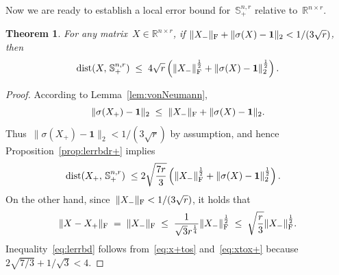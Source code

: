 \documentclass[11pt,a4paper]{article}  %
\newtheorem{theorem}{Theorem}%
\theoremstyle{definition}
\DeclareMathOperator{\dist}{dist}
\newcommand{\RR}{\mathbb{R}}
\newcommand{\col}{r}
\newcommand{\stf}[1]{\mathbb{S}^{#1}}
\newcommand{\fro}{{\scriptstyle{\textnormal{F}}}}
\newcommand{\ones}{\mathbf{1}}
\begin{document}
Now we are ready to establish a local error bound for~$\stf{n,\col}_+$ relative to~$\RR^{n\times \col}$.
\begin{theorem}%
    \label{th:lerrbd}
    For any matrix~$X\in \RR^{n\times \col}$, if
    $\|X_{-}\|_\fro + \|\sigma(X) - \ones\|_2 < 1/(3\sqrt{\col})$, then
    \begin{equation}
        \label{eq:lerrbd}
        \dist(X,\, \stf{n,\col}_+) \;\le\;
        4\sqrt{\col}  \left(\|X_{-}\|_\fro^{\frac{1}{2}}  + \|\sigma(X) -\ones\|_2^{\frac{1}{2}} \right).
    \end{equation}
\end{theorem}
\begin{proof}
    According to Lemma~\ref{lem:vonNeumann},
\begin{equation}
    \nonumber
    \|\sigma(X_+) -\ones\|_2 \;\le\; \|X_{-}\|_\fro + \|\sigma(X) -\ones\|_2.
\end{equation}
Thus~$\|\sigma(X_+) -\ones\|_2 < 1/(3\sqrt{\col})$ by assumption,
and hence Proposition~\ref{prop:lerrbdr+} implies
\begin{equation}
    \label{eq:x+tos}
    \begin{split}
    \dist(X_+,\, \stf{n,\col}_+)
    \;\le\; &2\sqrt{\frac{7\col}{3}}  \left(\|X_{-}\|_{\fro}^{\frac{1}{2}} + \|\sigma(X) - \ones\|_2^{\frac{1}{2}}\right).
    \end{split}
\end{equation}
On the other hand, since~$\|X_{-}\|_{\fro} < 1/(3\sqrt{\col})$, it holds that
\begin{equation}
    \label{eq:xtox+}
    \|X-X_+\|_\fro \;=\; \|X_{-}\|_\fro
    \;\le\; \frac{1}{\sqrt{3}\col^{\frac{1}{4}}} \|X_{-}\|_{\fro}^{\frac{1}{2}}
    \;\le\; \sqrt{\frac{\col}{3}} \|X_{-}\|_{\fro}^{\frac{1}{2}}.
\end{equation}
Inequality~\eqref{eq:lerrbd} follows from~\eqref{eq:x+tos} and~\eqref{eq:xtox+} because~$2\sqrt{7/3} + 1/\sqrt{3} < 4$.
\end{proof}
\end{document}
